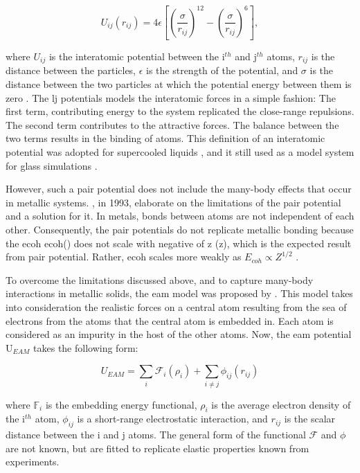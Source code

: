 \begin{equation} \label{e:lj}
		U_{ij}(r_{ij}) = 4 \epsilon \left[\left(\frac{\sigma}{r_{ij}}\right)^{12} -\left(\frac{\sigma}{r_{ij}}\right)^{6}\right],
\end{equation}

where $U_{ij}$ is the interatomic potential between the i$^{th}$ and j$^{th}$ atoms, $r_{ij}$ is the distance between the particles, $\epsilon$ is the strength of the potential, and $\sigma$ is the distance between the two particles at which the potential energy between them is zero \cite{Lee2016}. The \gls{lj} potentials models the interatomic forces in a simple fashion: The first term, contributing energy to the system replicated the close-range repulsions. The second term contributes to the attractive forces. The balance between the two terms results in the binding of atoms. This definition of an interatomic potential was adopted for supercooled liquids \cite{Kob1995}, and it still used as a model system for glass simulations \cite{Danilov2016}. \par

However, such a pair potential does not include the many-body effects that occur in metallic systems. \textcite{Daw1993}, in 1993, elaborate on the limitations of the pair potential and a solution for it. In metals, bonds between atoms are not independent of each other. Consequently, the pair potentials do not replicate metallic bonding because the \glsdesc{ecoh} \gls{ecoh}() does not scale with negative of \glsdesc{z} (\gls{z}), which is the expected result from pair potential. Rather, \gls{ecoh} scales more weakly as $E_{coh} \propto Z^{1/2}$ \cite{Daw1993}. \par

To overcome the limitations discussed above, and to capture many-body interactions in metallic solids, the \gls{eam} model was proposed by \textcite{Daw1983}. This model takes into consideration the realistic forces on a central atom resulting from the sea of electrons from the atoms that the central atom is embedded in. Each atom is considered as an impurity in the host of the other atoms. Now, the \gls{eam} potential U$_{EAM}$ takes the following form:

\begin{equation} \label{e:eam}
 	U_{EAM} = \sum_{i} \mathcal{F}_{i}(\rho_{i}) + \sum_{i \neq j} \phi_{ij}(r_{ij})  %
\end{equation}

where $\mathbb{F}_i$ is the embedding energy functional, $ \rho_{i}$ is the average electron density of the i$^{th}$ atom, $\phi_{ij} $ is a short-range electrostatic interaction, and $ r_{ij} $ is the scalar distance between the i and j atoms. The general form of the functional $\mathcal{F}$ and $\phi$ are not known, but are fitted to replicate elastic properties known from experiments.\par  

